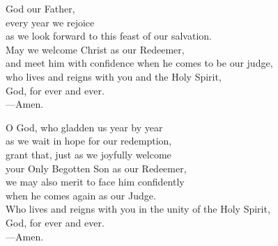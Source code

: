 \prayer

\begin{prayerverse}

God our Father,\\
every year we rejoice\\
as we look forward to this feast of our salvation.\\
May we welcome Christ as our Redeemer,\\
and meet him with confidence when he comes to be our judge,\\
who lives and reigns with you and the Holy Spirit,\\
God, for ever and ever.\\
{\color{red}---\thinspace}Amen.

\end{prayerverse}


\begin{prayerverse}

O God, who gladden us year by year\\
as we wait in hope for our redemption,\\
grant that, just as we joyfully welcome\\
your Only Begotten Son as our Redeemer,\\
we may also merit to face him confidently\\
when he comes again as our Judge.\\
Who lives and reigns with you in the unity of the Holy Spirit,\\
God, for ever and ever.\\
{\color{red}---\thinspace}Amen.

\end{prayerverse}